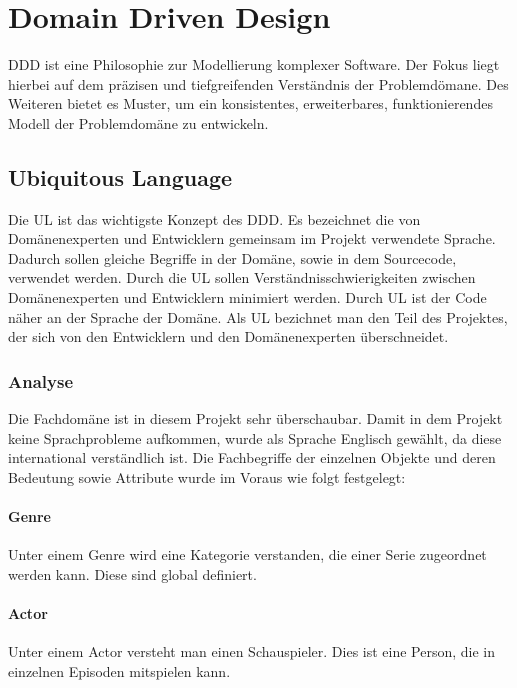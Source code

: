 
\chapter{Domain Driven Design}
\ac{DDD} ist eine Philosophie zur Modellierung komplexer Software. Der Fokus liegt hierbei auf dem präzisen und tiefgreifenden Verständnis der Problemdömane. Des Weiteren bietet es Muster, um ein konsistentes, erweiterbares, funktionierendes Modell der Problemdomäne zu entwickeln.

\section{Ubiquitous Language}
Die \ac{UL} ist das wichtigste Konzept des \ac{DDD}. Es bezeichnet die von Domänenexperten und Entwicklern gemeinsam im Projekt verwendete Sprache. Dadurch sollen gleiche Begriffe in der Domäne, sowie in dem Sourcecode, verwendet werden. Durch die \ac{UL} sollen Verständnisschwierigkeiten zwischen Domänenexperten und Entwicklern minimiert werden. Durch \ac{UL} ist der Code näher an der Sprache der Domäne. Als \ac{UL} bezichnet man den Teil des Projektes, der sich von den Entwicklern und den Domänenexperten überschneidet.

\subsection{Analyse}
Die Fachdomäne ist in diesem Projekt sehr überschaubar. Damit in dem Projekt keine Sprachprobleme aufkommen, wurde als Sprache Englisch gewählt, da diese international verständlich ist. Die Fachbegriffe der einzelnen Objekte und deren Bedeutung sowie Attribute wurde im Voraus wie folgt festgelegt:

\subsubsection{Genre}
Unter einem Genre wird eine Kategorie verstanden, die einer Serie zugeordnet werden kann. Diese sind global definiert.
\subsubsection{Actor}
Unter einem Actor versteht man einen Schauspieler. Dies ist eine Person, die in einzelnen Episoden mitspielen kann.
